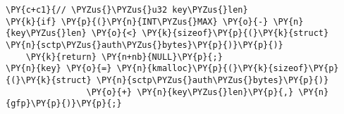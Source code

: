 \begin{Verbatim}[commandchars=\\\{\},codes={\catcode`\$=3\catcode`\^=7\catcode`\_=8}]
\PY{c+c1}{// \PYZus{}\PYZus{}u32 key\PYZus{}len}
\PY{k}{if} \PY{p}{(}\PY{n}{INT\PYZus{}MAX} \PY{o}{-} \PY{n}{key\PYZus{}len} \PY{o}{<} \PY{k}{sizeof}\PY{p}{(}\PY{k}{struct} \PY{n}{sctp\PYZus{}auth\PYZus{}bytes}\PY{p}{)}\PY{p}{)}
    \PY{k}{return} \PY{n+nb}{NULL}\PY{p}{;}
\PY{n}{key} \PY{o}{=} \PY{n}{kmalloc}\PY{p}{(}\PY{k}{sizeof}\PY{p}{(}\PY{k}{struct} \PY{n}{sctp\PYZus{}auth\PYZus{}bytes}\PY{p}{)}
                \PY{o}{+} \PY{n}{key\PYZus{}len}\PY{p}{,} \PY{n}{gfp}\PY{p}{)}\PY{p}{;}
\end{Verbatim}
